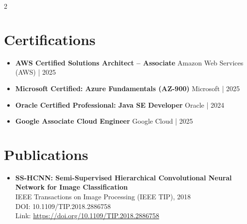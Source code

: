 \documentclass[10pt,a4paper]{article}
\begin{document}
\begin{paracol}{2}
\section*{Certifications}

\begin{itemize}
    \item \textbf{AWS Certified Solutions Architect – Associate} \hfill Amazon Web Services (AWS) | 2025
    \item \textbf{Microsoft Certified: Azure Fundamentals (AZ-900)} \hfill Microsoft | 2025
    \item \textbf{Oracle Certified Professional: Java SE Developer} \hfill Oracle | 2024
    \item \textbf{Google Associate Cloud Engineer} \hfill Google Cloud | 2025
\end{itemize}

\section*{Publications}

\begin{itemize}
    \item \textbf{SS-HCNN: Semi-Supervised Hierarchical Convolutional Neural Network for Image Classification} \\
    IEEE Transactions on Image Processing (IEEE TIP), 2018 \\
    DOI: 10.1109/TIP.2018.2886758 \\
    Link: \url{https://doi.org/10.1109/TIP.2018.2886758}
\end{itemize}

\end{paracol}
\end{document}
